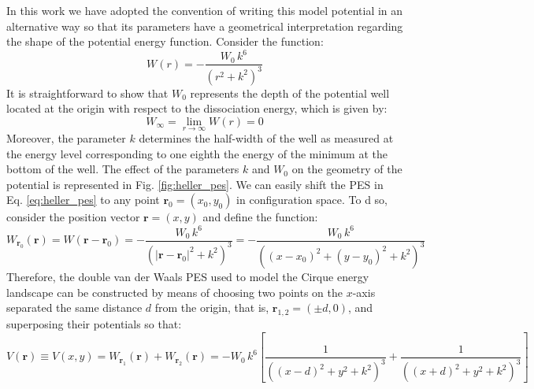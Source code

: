 \documentclass[10pt,aps,onecolumn,superscriptaddress]{revtex4-2}
\begin{document}
In this work we have adopted the convention of writing this model potential in an alternative way so that its parameters have a geometrical interpretation regarding the shape of the potential energy function. Consider the function:
\begin{equation}
W(r) = - \dfrac{W_0 \, k^6}{\left(r^2 + k^2\right)^3}
\label{eq:heller_pes}
\end{equation}
It is straightforward to show that $W_0$ represents the depth of the potential well located at the origin with respect to the dissociation energy, which is given by:
\begin{equation}
W_{\infty} = \lim_{r \to \infty} W(r) = 0
\end{equation}
Moreover, the parameter $k$ determines the half-width of the well as measured at the energy level corresponding to one eighth the energy of the minimum at the bottom of the well. The effect of the parameters $k$ and $W_0$ on the geometry of the potential is represented in Fig. \ref{fig:heller_pes}. We can easily shift the PES in Eq. \eqref{eq:heller_pes} to any point $\mathbf{r}_0 = (x_0,y_0)$ in configuration space. To d so, consider the position vector $\mathbf{r} = (x,y)$ and define the function:
\begin{equation}
W_{\mathbf{r}_0}(\mathbf{r}) = W(\mathbf{r} - \mathbf{r}_0) = - \dfrac{W_0 \, k^6}{\left( |\mathbf{r} - \mathbf{r}_0|^2 + k^2\right)^3} = - \dfrac{W_0 \, k^6}{\left(\left(x-x_0\right)^2 + \left(y-y_0\right)^2 + k^2\right)^3}
\end{equation}
Therefore, the double van der Waals PES used to model the Cirque energy landscape can be  constructed by means of choosing two points on the $x$-axis separated the same distance $d$ from the origin, that is, $\mathbf{r}_{1,2} = (\pm d,0)$, and superposing their potentials so that:
\begin{equation}
V(\mathbf{r}) \equiv V(x,y) =  W_{\mathbf{r}_1}(\mathbf{r}) + W_{\mathbf{r}_2}(\mathbf{r})
= - W_0 \, k^6 \left[\dfrac{1}{\left(\left(x - d\right)^2 + y^2 + k^2\right)^3} + \dfrac{1}{\left(\left(x + d\right)^2 + y^2 + k^2\right)^3} \right]
\label{eq:double_vdw}
\end{equation}
\end{document}
